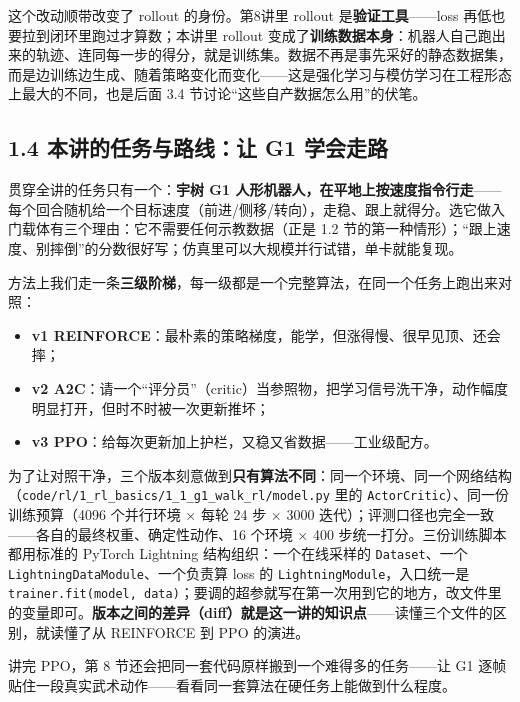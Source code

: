 \documentclass[
  chinese,
]{ctexart}
\providecommand{\tightlist}{%
  \setlength{\itemsep}{0pt}\setlength{\parskip}{0pt}}
\begin{document}
这个改动顺带改变了 rollout 的身份。第8讲里 rollout
是\textbf{验证工具}------loss 再低也要拉到闭环里跑过才算数；本讲里
rollout
变成了\textbf{训练数据本身}：机器人自己跑出来的轨迹、连同每一步的得分，就是训练集。数据不再是事先采好的静态数据集，而是边训练边生成、随着策略变化而变化------这是强化学习与模仿学习在工程形态上最大的不同，也是后面
3.4 节讨论``这些自产数据怎么用''的伏笔。

\subsection{1.4 本讲的任务与路线：让 G1
学会走路}\label{ux672cux8bb2ux7684ux4efbux52a1ux4e0eux8defux7ebfux8ba9-g1-ux5b66ux4f1aux8d70ux8def}

贯穿全讲的任务只有一个：\textbf{宇树 G1
人形机器人，在平地上按速度指令行走}------每个回合随机给一个目标速度（前进/侧移/转向），走稳、跟上就得分。选它做入门载体有三个理由：它不需要任何示教数据（正是
1.2
节的第一种情形）；``跟上速度、别摔倒''的分数很好写；仿真里可以大规模并行试错，单卡就能复现。

方法上我们走一条\textbf{三级阶梯}，每一级都是一个完整算法，在同一个任务上跑出来对照：

\begin{itemize}
\tightlist
\item
  \textbf{v1
  REINFORCE}：最朴素的策略梯度，能学，但涨得慢、很早见顶、还会摔；
\item
  \textbf{v2
  A2C}：请一个``评分员''（critic）当参照物，把学习信号洗干净，动作幅度明显打开，但时不时被一次更新推坏；
\item
  \textbf{v3 PPO}：给每次更新加上护栏，又稳又省数据------工业级配方。
\end{itemize}

为了让对照干净，三个版本刻意做到\textbf{只有算法不同}：同一个环境、同一个网络结构（\texttt{code/rl/1\_rl\_basics/1\_1\_g1\_walk\_rl/model.py}
里的 \texttt{ActorCritic}）、同一份训练预算（4096 个并行环境 × 每轮 24
步 × 3000 迭代）；评测口径也完全一致------各自的最终权重、确定性动作、16
个环境 × 400 步统一打分。三份训练脚本都用标准的 PyTorch Lightning
结构组织：一个在线采样的 \texttt{Dataset}、一个
\texttt{LightningDataModule}、一个负责算 loss 的
\texttt{LightningModule}，入口统一是
\texttt{trainer.fit(model,\ data)}；要调的超参就写在第一次用到它的地方，改文件里的变量即可。\textbf{版本之间的差异（diff）就是这一讲的知识点}------读懂三个文件的区别，就读懂了从
REINFORCE 到 PPO 的演进。

讲完 PPO，第 8 节还会把同一套代码原样搬到一个难得多的任务------让 G1
逐帧贴住一段真实武术动作------看看同一套算法在硬任务上能做到什么程度。
\end{document}
